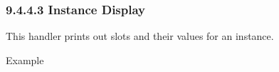 \documentclass[letterpaper,10pt,english]{sphinxmanual}
\begin{document}
\subsubsection{9.4.4.3 Instance Display}
\label{\detokenize{cool:instance-display}}

\begin{sphinxVerbatim}[commandchars=\\\{\}]
    
\end{sphinxVerbatim}

This handler prints out slots and their values for an instance.

Example

\begin{sphinxVerbatim}[commandchars=\\\{\}]
    


\end{sphinxVerbatim}
\end{document}
